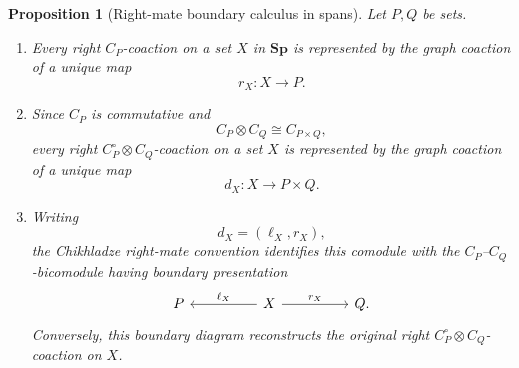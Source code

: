 \documentclass[oneside]{article}
\newcommand{\Sp}{\mathbf{Sp}}
\theoremstyle{plain}
\newtheorem{proposition}[theorem]{Proposition}
\theoremstyle{definition}
\theoremstyle{remark}
\begin{document}
\begin{proposition}[Right-mate boundary calculus in spans]
\label{prop:cgqg-right-mate-boundary-presentation}
    Let \(P,Q\) be sets.
    \begin{enumerate}
        \item Every right \(C_P\)-coaction on a set \(X\) in \(\Sp\) is represented by the graph coaction of a unique map
        \[
            r_X:X\longrightarrow P.
        \]

        \item Since \(C_P\) is commutative and
        \[
            C_P\otimes C_Q\cong C_{P\times Q},
        \]
        every right \(C_P^\circ\otimes C_Q\)-coaction on a set \(X\) is represented by the graph coaction of a unique map
        \[
            d_X:X\longrightarrow P\times Q.
        \]

        \item Writing
        \[
            d_X=(\ell_X,r_X),
        \]
        the Chikhladze right-mate convention identifies this comodule with the \(C_P\)--\(C_Q\)-bicomodule having boundary presentation
        \begin{equation}
            \begin{tikzcd}[column sep=huge]
                P
                &
                X
                    \arrow[l,"\ell_X"']
                    \arrow[r,"r_X"]
                &
                Q.
            \end{tikzcd}
            \label{eq:cgqg-right-mate-boundary-diagram}
        \end{equation}
        Conversely, this boundary diagram reconstructs the original right \(C_P^\circ\otimes C_Q\)-coaction on \(X\).
    \end{enumerate}
\end{proposition}
\end{document}
